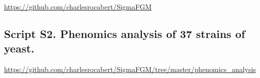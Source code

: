 \href{https://github.com/charlesrocabert/SigmaFGM}{https://github.com/charlesrocabert/SigmaFGM}

\newpage


\subsection{Script S2. Phenomics analysis of 37 strains of yeast.}
\label{part1:ScriptS2}

\href{https://github.com/charlesrocabert/SigmaFGM/tree/master/phenomics\_analysis}{https://github.com/charlesrocabert/SigmaFGM/tree/master/phenomics\_analysis}

\newpage








